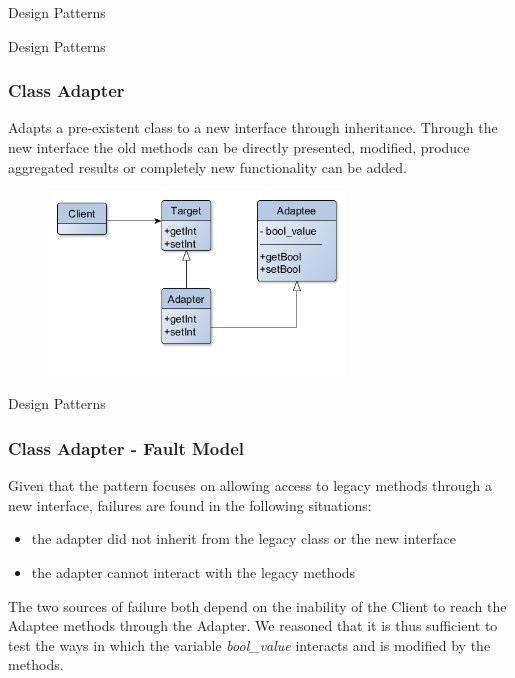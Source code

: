 \documentclass{beamer}
\begin{document}
\begin{section}{Design Patterns}
	\begin{subsection}{Design Patterns}
		\begin{frame}
			\frametitle{Class Adapter}
Adapts a pre-existent class to a new interface through inheritance. Through the new interface the old methods can be directly presented, modified, produce aggregated results or completely new functionality can be added.

\begin{figure}[!h]
	\centering
	\includegraphics[width=0.7\textwidth]{./Adapter/Class/ClassDiagram.png}	
	\label{CAclassDiag}
\end{figure} 

		\end{frame}
	\end{subsection}
	
	
	\begin{subsection}{Design Patterns}
		\begin{frame}
			\frametitle{Class Adapter - Fault Model}
Given that the pattern focuses on allowing access to legacy methods through a new interface, failures are found in the following situations:  
\begin{itemize}
	\item the adapter did not inherit from the legacy class or the new interface
	\item the adapter cannot interact with the legacy methods 
\end{itemize}
\vspace{5mm}
The two sources of failure both depend on the inability of the Client to reach the Adaptee methods through the Adapter.  We reasoned that it is thus sufficient to test the ways in which the variable \textit{bool\_value} interacts and is modified by the methods.
			
		\end{frame}
	
	\end{subsection}
	

\end{section}
\end{document}

